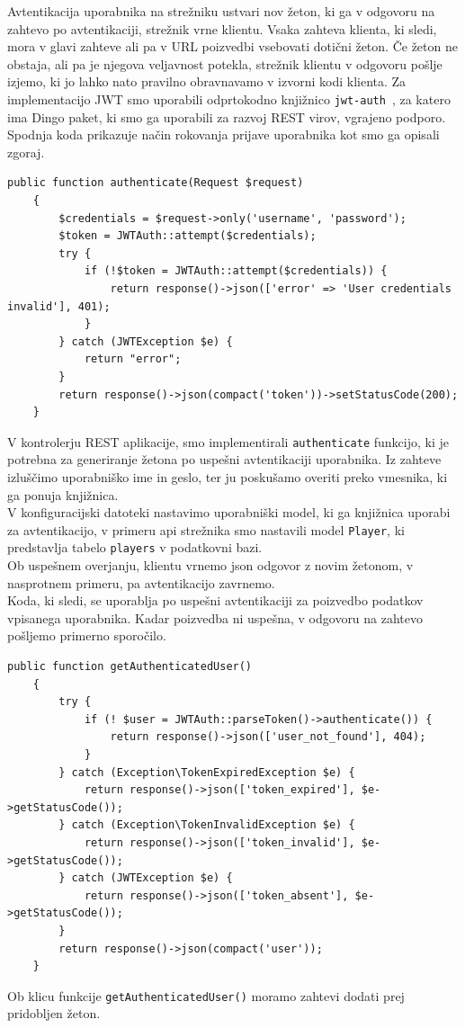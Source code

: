 \documentclass[a4paper, 12pt]{book}
\begin{document}
Avtentikacija uporabnika na strežniku ustvari nov žeton, ki ga v odgovoru na zahtevo po avtentikaciji, strežnik vrne klientu. Vsaka zahteva klienta, ki sledi, mora v glavi zahteve ali pa v URL poizvedbi vsebovati dotični žeton. Če žeton ne obstaja, ali pa je njegova veljavnost potekla, strežnik klientu v odgovoru pošlje izjemo, ki jo lahko nato pravilno obravnavamo v izvorni kodi klienta. Za implementacijo JWT smo uporabili odprtokodno knjižnico \texttt{jwt-auth}~\cite{tymon}, za katero ima Dingo paket, ki smo ga uporabili za razvoj REST virov, vgrajeno podporo. Spodnja koda prikazuje način rokovanja prijave uporabnika kot smo ga opisali zgoraj.
\begin{lstlisting}
public function authenticate(Request $request)
    {
        $credentials = $request->only('username', 'password');
        $token = JWTAuth::attempt($credentials);
        try {
            if (!$token = JWTAuth::attempt($credentials)) {
                return response()->json(['error' => 'User credentials invalid'], 401);
            }
        } catch (JWTException $e) {
            return "error";
        }
        return response()->json(compact('token'))->setStatusCode(200);
    }
\end{lstlisting}
V kontrolerju REST aplikacije, smo implementirali \texttt{authenticate} funkcijo, ki je potrebna za generiranje žetona po uspešni avtentikaciji uporabnika. Iz zahteve izluščimo uporabniško ime in geslo, ter ju poskušamo overiti preko vmesnika, ki ga ponuja knjižnica.\\V konfiguracijski datoteki nastavimo uporabniški model, ki ga knjižnica uporabi za avtentikacijo, v primeru api strežnika smo nastavili model \texttt{Player}, ki predstavlja tabelo \texttt{players} v podatkovni bazi.\\ Ob uspešnem overjanju, klientu vrnemo json odgovor z novim žetonom, v nasprotnem primeru, pa avtentikacijo zavrnemo.\\Koda, ki sledi, se uporablja po uspešni avtentikaciji za poizvedbo podatkov vpisanega uporabnika. Kadar poizvedba ni uspešna, v odgovoru na zahtevo pošljemo primerno sporočilo.
\begin{lstlisting}
public function getAuthenticatedUser()
    {
        try {
            if (! $user = JWTAuth::parseToken()->authenticate()) {
                return response()->json(['user_not_found'], 404);
            }
        } catch (Exception\TokenExpiredException $e) {
            return response()->json(['token_expired'], $e->getStatusCode());
        } catch (Exception\TokenInvalidException $e) {
            return response()->json(['token_invalid'], $e->getStatusCode());
        } catch (JWTException $e) {
            return response()->json(['token_absent'], $e->getStatusCode());
        }
        return response()->json(compact('user'));
    }
\end{lstlisting}
Ob klicu funkcije \texttt{getAuthenticatedUser()} moramo zahtevi dodati prej pridobljen žeton.
\end{document}
